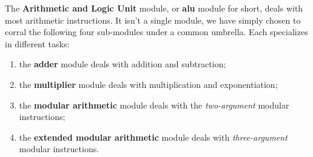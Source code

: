 The \textbf{Arithmetic and Logic Unit} module, or \textbf{alu} module for short, deals with most arithmetic instructions. It isn't a single module, we have simply chosen to corral the following four sub-modules under a common umbrella. Each specializes in different tasks:
\begin{enumerate}
	\item the \textbf{adder} module deals with addition and subtraction;
	\item the \textbf{multiplier} module deals with multiplication and exponentiation;
	\item the \textbf{modular arithmetic} module deals with the \emph{two-argument} modular instructions;
	\item the \textbf{extended modular arithmetic} module deals with \emph{three-argument} modular instructions. 
\end{enumerate}